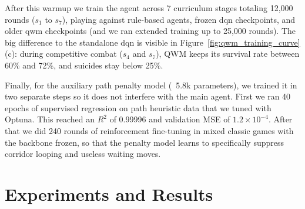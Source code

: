 \documentclass[article, 10pt]{IEEEtran}
\begin{document}
After this warmup we train the agent across 7 curriculum stages totaling 12,000 rounds ($s_1$ to $s_7$), playing against rule-based agents, frozen dqn checkpoints, and older qwm checkpoints (and we ran extended training up to 25,000 rounds). The big difference to the standalone dqn is visible in Figure~\ref{fig:qwm_training_curve}(c): during competitive combat ($s_4$ and $s_7$), QWM keeps its survival rate between 60\% and 72\%, and suicides stay below 25\%.

Finally, for the auxiliary path penalty model (~5.8k parameters), we trained it in two separate steps so it does not interfere with the main agent. First we ran 40 epochs of supervised regression on path heuristic data that we tuned with Optuna. This reached an $R^2$ of 0.99996 and validation MSE of $1.2 \times 10^{-4}$. After that we did 240 rounds of reinforcement fine-tuning in mixed classic games with the backbone frozen, so that the penalty model learns to specifically suppress corridor looping and useless waiting moves.

\section{Experiments and Results}\label{sec:6_experimentsandresults}
\end{document}
